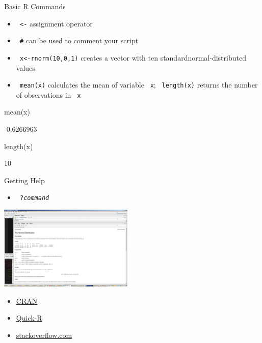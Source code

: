 \documentclass[11pt,german,hideothersubsections]{beamer}
\newcommand{\R}[1]{{\tt \color{blue}  #1}}
\begin{document}
\begin{frame}[fragile]{Basic R Commands}
\begin{itemize}
\item \R{<-}  assignment operator
\item \R{\#} can be used to comment your script
\item \R{x<-rnorm(10,0,1)}  creates a vector with ten standardnormal-distributed values
\item \R{mean(x)} calculates the mean of variable \R{x}; \R{length(x)} returns the number of observations in \R{x}
\end{itemize}
\begin{Schunk}
\begin{Sinput}
 mean(x)
\end{Sinput}
\begin{Soutput}
[1] -0.6266963
\end{Soutput}
\begin{Sinput}
 length(x)
\end{Sinput}
\begin{Soutput}
[1] 10
\end{Soutput}
\end{Schunk}
\end{frame}
\begin{frame}[fragile]{Getting Help}
\begin{itemize}
\item \R{?\emph{command}}
\end{itemize}
\includegraphics[width=\textwidth, height=4cm]{../figure/rhlep.png}
\begin{itemize}
\item \href{https://cran.r-project.org}{CRAN}
\item \href{http://www.statmethods.net}{Quick-R}
\item \href{http://stackoverflow.com/questions/tagged/r}{stackoverflow.com}
\end{itemize}

\end{frame}
\end{document}
